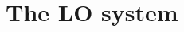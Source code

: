 \documentclass[xcolor=dvipsnames,hyperref={pdfpagelabels=false},unknownkeysallowed]{beamer}
\newcommand{\keff}[0]{\ensuremath{{k}_{\textsf{eff}}} }
\newcommand{\B}[1]{\ensuremath{\mathbf{#1}}}
\begin{document}





\section{The LO system}
\subsection{}
\end{document}
